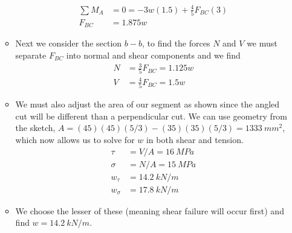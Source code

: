 \documentclass[12pt, oneside]{article}
\begin{document}
\begin{enumerate}
\begin{itemize}
\begin{align*}
				\sum M_A &= 0 = -3w(1.5) + \frac{4}{5} F_{BC}(3)\\
				F_{BC} &= 1.875w
			\end{align*}
		\item Next we consider the section $b-b$, to find the forces $N$ and $V$ we must separate $F_{BC}$ into normal and shear components and we find
			\begin{align*}
				N &= \frac{3}{5} F_{BC} = 1.125w\\
				V &= \frac{4}{5} F_{BC} = 1.5w
			\end{align*}
		\item We must also adjust the area of our segment as shown since the angled cut will be different than a perpendicular cut. 
      We can use geometry from the sketch, $A = (45)(45)(5/3) - (35)(35)(5/3) = \SI{1333}{mm^2}$, which now allows us to solve for $w$ in both shear and tension.
			\begin{align*}
				\tau &= V/A = \SI{16}{MPa}\\
				\sigma &= N/A = \SI{15}{MPa}\\
				w_\tau &= \SI{14.2}{kN/m}\\
				w_\sigma &= \SI{17.8}{kN/m}
			\end{align*}
		\item We choose the lesser of these (meaning shear failure will occur first) and find $w=\SI{14.2}{kN/m}$.
		\end{itemize}
	

\end{enumerate}
\end{document}
